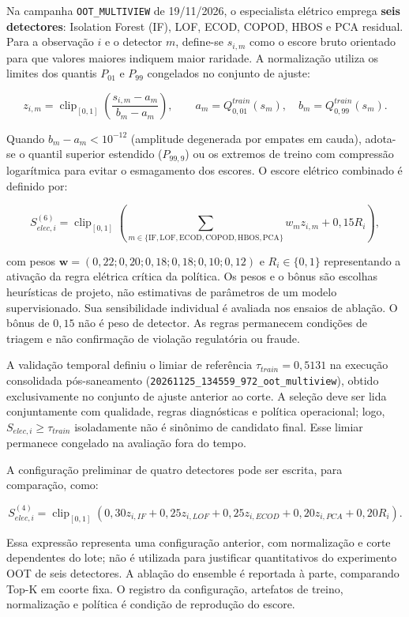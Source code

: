 Na campanha \texttt{OOT\_MULTIVIEW} de 19/11/2026, o especialista elétrico emprega \textbf{seis detectores}: Isolation Forest (IF), LOF, ECOD, COPOD, HBOS e PCA residual. Para a observação \(i\) e o detector \(m\), define-se \(s_{i,m}\) como o escore bruto orientado para que valores maiores indiquem maior raridade. A normalização utiliza os limites dos quantis $P_{01}$ e $P_{99}$ congelados no conjunto de ajuste:

\[z_{i,m}=\operatorname{clip}_{[0,1]}\!\left(\frac{s_{i,m}-a_m}{b_m-a_m}\right),\qquad a_m=Q_{0,01}^{train}(s_m),\quad b_m=Q_{0,99}^{train}(s_m).\]

Quando \(b_m-a_m<10^{-12}\) (amplitude degenerada por empates em cauda), adota-se o quantil superior estendido ($P_{99,9}$) ou os extremos de treino com compressão logarítmica para evitar o esmagamento dos escores. O escore elétrico combinado é definido por:

\[S_{elec,i}^{(6)}=\operatorname{clip}_{[0,1]}\!\left(\sum_{m\in\{\mathrm{IF},\mathrm{LOF},\mathrm{ECOD},\mathrm{COPOD},\mathrm{HBOS},\mathrm{PCA}\}}w_mz_{i,m}+0{,}15R_i\right),\]

com pesos \(\mathbf w=(0{,}22;0{,}20;0{,}18;0{,}18;0{,}10;0{,}12)\) e \(R_i\in\{0,1\}\) representando a ativação da regra elétrica crítica da política. Os pesos e o bônus são escolhas heurísticas de projeto, não estimativas de parâmetros de um modelo supervisionado. Sua sensibilidade individual é avaliada nos ensaios de ablação. O bônus de \(0{,}15\) não é peso de detector. As regras permanecem condições de triagem e não confirmação de violação regulatória ou fraude.

A validação temporal definiu o limiar de referência \(\tau_{train}=0{,}5131\) na execução consolidada pós-saneamento (\texttt{20261125\_134559\_972\_oot\_multiview}), obtido exclusivamente no conjunto de ajuste anterior ao corte. A seleção deve ser lida conjuntamente com qualidade, regras diagnósticas e política operacional; logo, \(S_{elec,i}\ge\tau_{train}\) isoladamente não é sinônimo de candidato final. Esse limiar permanece congelado na avaliação fora do tempo.

A configuração preliminar de quatro detectores pode ser escrita, para comparação, como:

\[S_{elec,i}^{(4)}=\operatorname{clip}_{[0,1]}\!\left(0{,}30z_{i,IF}+0{,}25z_{i,LOF}+0{,}25z_{i,ECOD}+0{,}20z_{i,PCA}+0{,}20R_i\right).\]

Essa expressão representa uma configuração anterior, com normalização e corte dependentes do lote; não é utilizada para justificar quantitativos do experimento OOT de seis detectores. A ablação do ensemble é reportada à parte, comparando Top-K em coorte fixa. O registro da configuração, artefatos de treino, normalização e política é condição de reprodução do escore.

